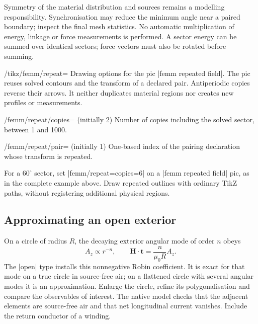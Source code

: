 Symmetry of the material distribution and sources remains a modelling
responsibility. Synchronisation may reduce the minimum angle near a paired
boundary; inspect the final mesh statistics. No automatic multiplication of
energy, linkage or force measurements is performed. A sector energy can be
summed over identical sectors; force vectors must also be rotated before summing.

\begin{key}{/tikz/femm/repeat=}
Drawing options for the pic |femm repeated field|. The pic reuses solved contours
and the transform of a declared pair. Antiperiodic copies reverse their arrows.
It neither duplicates material regions nor creates new profiles or measurements.
\end{key}
\begin{key}{/femm/repeat/copies= (initially 2)}
Number of copies including the solved sector, between 1 and 1000.
\end{key}
\begin{key}{/femm/repeat/pair= (initially 1)}
One-based index of the pairing declaration whose transform is repeated.
\end{key}
For a $60^\circ$ sector, set |femm/repeat={copies=6}| on a
|femm repeated field| pic, as in the complete example above. Draw repeated
outlines with ordinary TikZ paths, without registering additional physical regions.

\subsection{Approximating an open exterior}
On a circle of radius $R$, the decaying exterior angular mode of order $n$ obeys
\[
 A_z\propto r^{-n},\qquad
 \mathbf H\cdot\mathbf t=\frac{n}{\mu_0 R}A_z.
\]
The |open| type installs this nonnegative Robin coefficient. It is exact for
that mode on a true circle in source-free air; on a flattened circle with
several angular modes it is an approximation. Enlarge the circle, refine its
polygonalisation and compare the observables of interest. The native model
checks that the adjacent elements are source-free air and that net longitudinal
current vanishes. Include the return conductor of a winding.

